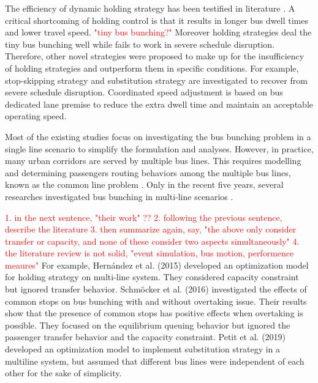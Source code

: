 \documentclass[smallextended]{svjour3}       %
\begin{document}
\begin{Abstract}
The efficiency of dynamic holding strategy has been testified in literature
\citep{2009Daganzo,2011Xuan,2012ABartholdi,2015Argote-Cabanero}.
A critical shortcoming of holding control is that it results in longer bus dwell times and lower travel speed.
\textcolor{red}{"tiny bus bunching?"}
Moreover holding strategies deal the tiny bus bunching well while fails to work in severe schedule disruption.
Therefore, other novel strategies were proposed to make up for the insufficiency of holding strategies and outperform them in specific conditions. For example, stop-skipping strategy \citep{2003Fu,2005Sun} 
and substitution strategy \citep{2018Petit,2019Petit} are investigated to recover from severe schedule disruption. Coordinated speed adjustment \citep{2011Daganzo} is based on bus dedicated lane premise to reduce the extra dwell time and maintain an acceptable operating speed.

Most of the existing studies focus on investigating the bus bunching problem in a single line scenario to simplify the formulation and analyses. However, in practice, many urban corridors are served by multiple bus lines. This requires modelling and determining passengers routing behaviors among the multiple bus lines, known as the common line problem \citep{2015Argote-Cabanero}. 
Only in the recent five years, several researches investigated bus bunching in multi-line scenarios \citep{2015Carlos,2015Argote-Cabanero,2016Sun,2019Petit,2020Seman}. %

\textcolor{red}{
1. in the next sentence, "their work" ??
2. following the previous sentence, describe the literature 
3. then summarize again, say, "the above only consider transfer or capacity, and none of these consider two aspects simultaneously"
4. the literature review is not solid, "event simulation, bus motion, performence meaures"
}
For example, Hernández et al. (2015) developed an optimization model for holding strategy on multi-line system.
They considered capacity constraint but ignored transfer behavior. Schmöcker et al. (2016) investigated the effects of common stops on bus bunching with and without overtaking issue. 
Their results show that the presence of common stops has positive effects when overtaking is possible.
They focused on the equilibrium queuing behavior but ignored the passenger transfer behavior and the capacity constraint. 
Petit et al. (2019) developed an optimization model to implement substitution strategy 
in a multiline system, but assumed that different bus lines were independent of each other for the sake of simplicity. 


\end{Abstract}
\end{document}
